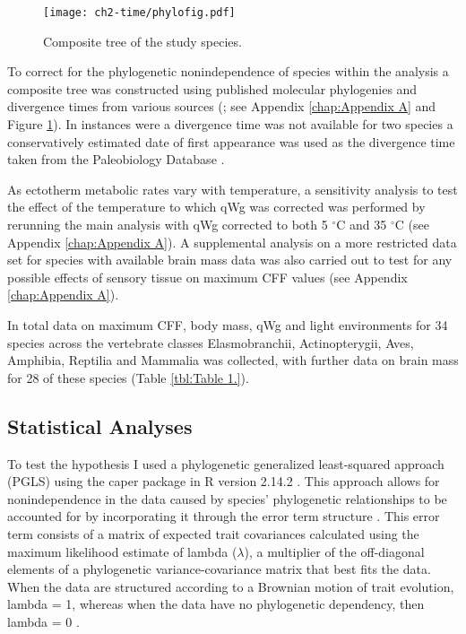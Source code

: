 \begin{figure}[h!]
  \centering
  \texttt{[image: ch2-time/phylofig.pdf]}%
  \caption[Figure 2.]{Composite tree of the study species.}
  \label{fig:Figure 2.}
\end{figure}


To correct for the phylogenetic nonindependence of species within the analysis a composite tree was constructed using published molecular phylogenies and divergence times from various sources (\cite{schoch1985preliminary,janossy2011pleistocene,mercer2003effects,hedges2006timetree,wiens2006does,benton2007paleontological,murphy2007using,brown2008strong,li2008optimal,naro2008evolutionary,albert2009effect,lim2010phylogeny,little2010evolutionary,perelman2011molecular}; see Appendix \ref{chap:Appendix A} and Figure \ref{fig:Figure 2.}). In instances were a divergence time was not available for two species a conservatively estimated date of first appearance was used as the divergence time taken from the Paleobiology Database \citep{alroy2008phanerozoic}.


As ectotherm metabolic rates vary with temperature, a sensitivity analysis to test the effect of the temperature to which qWg was corrected was performed by rerunning the main analysis with qWg corrected to both 5 $^{\circ}$C and 35 $^{\circ}$C (see Appendix \ref{chap:Appendix A}). A supplemental analysis on a more restricted data set for species with available brain mass data was also carried out to test for any possible effects of sensory tissue on maximum CFF values (see Appendix \ref{chap:Appendix A}).

In total data on maximum CFF, body mass, qWg and light environments for 34 species across the vertebrate classes Elasmobranchii, Actinopterygii, Aves, Amphibia, Reptilia and Mammalia was collected, with further data on brain mass for 28 of these species (Table \ref{tbl:Table 1.}).

\subsection{Statistical Analyses}
To test the hypothesis I used a phylogenetic generalized least-squared approach (PGLS) using the caper package \citep{orme2011caper} in R version 2.14.2 \citep{RCran}. This approach allows for nonindependence in the data caused by species' phylogenetic relationships to be accounted for by incorporating it through the error term structure \citep{pagel1999inferring,rohlf2001comparative}. This error term consists of a matrix of expected trait covariances calculated using the maximum likelihood estimate of lambda ($\lambda$), a multiplier of the off-diagonal elements of a phylogenetic variance-covariance matrix that best fits the data. When the data are structured according to a Brownian motion of trait evolution, lambda = 1, whereas when the data have no phylogenetic dependency, then lambda = 0 \citep{pagel1999inferring}.

